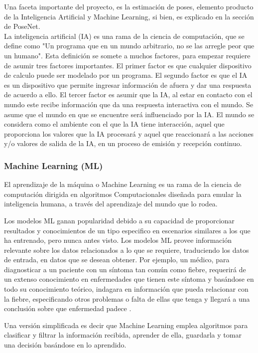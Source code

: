 Una faceta importante del proyecto, es la estimación de poses, elemento producto de la Inteligencia Artificial y Machine Learning, si bien, es explicado en la sección de PoseNet.
\\
La inteligencia artificial (IA) es una rama de la ciencia de computación, que se define como "Un programa que en un mundo arbitrario, no se las arregle peor que un humano"\cite{dobrev2012definition}. 
Esta definición se somete a muchos factores, para empezar requiere de asumir tres factores importantes.
El primer factor es que cualquier dispositivo de calculo puede ser modelado por un programa. El segundo factor es que el IA es un dispositivo que permite ingresar información de afuera y dar una respuesta de acuerdo a ello. El tercer factor es asumir que la IA, al estar en contacto con el mundo este recibe información que da una respuesta interactiva con el mundo. Se asume que el mundo en que se encuentre será influenciado por la IA\cite{dobrev2012definition}. El mundo se considera como el ambiente con el que la IA tiene interacción, aquel que proporciona los valores que la IA procesará y aquel que reaccionará a las acciones y/o valores de salida de la IA, en un proceso de emisión y recepción continuo.

\subsubsection{Machine Learning (ML)}

El aprendizaje de la máquina o Machine Learning es ua rama de la ciencia de computación dirigida en algoritmos Computacionales diseñada para emular la inteligencia humana, a través del aprendizaje del mundo que lo rodea.

Los modelos ML ganan popularidad debido a su capacidad de proporcionar resultados y conocimientos de un tipo especifico en escenarios similares a los que ha entrenado, pero nunca antes visto. Los modelos ML provee información relevante sobre los datos relacionados a lo que se requiere, traduciendo los datos de entrada, en datos que se desean obtener. Por ejemplo, un médico, para diagnosticar a un paciente con un síntoma tan común como fiebre, requerirá de un extenso conocimiento en enfermedades que tienen este síntoma y basándose en todo su conocimiento teórico, indagara en información que pueda relacionar con la fiebre, especificando otros problemas o falta de ellas que tenga y llegará a una conclusión sobre que enfermedad padece \cite{murdoch2019interpretable}.

Una versión simplificada es decir que Machine Learning emplea algoritmos para clasificar y filtrar la información recibida, aprender de ella, guardarla y tomar una decisión basándose en lo aprendido. 

